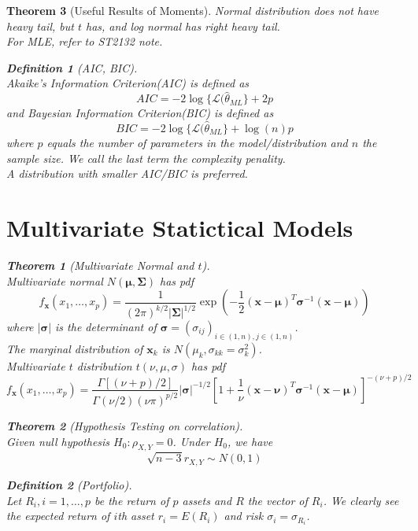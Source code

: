 \documentclass[12pt]{article}
\newtheorem{definition}{Definition}[section]
\newtheorem{theorem}{Theorem}[section]
\theoremstyle{definition}
\begin{document}
\begin{theorem}[Useful Results of Moments]
Normal distribution does not have heavy tail, but $t$ has, and log normal has right heavy tail.\\
For MLE, refer to ST2132 note.
\begin{definition}[AIC, BIC]
\hfill\\\normalfont 
Akaike's Information Criterion(AIC) is defined as
\[
AIC=-2\log\{\mathcal{L}(\hat{\theta}_{ML}\}+ 2p
\]
and Bayesian Information Criterion(BIC) is defined as
\[
BIC=-2\log\{\mathcal{L}(\hat{\theta}_{ML}\} + \log(n)p
\]
where $p$ equals the number of parameters in the model/distribution and $n$ the sample size. We call the last term the complexity penality.\\
A distribution with smaller AIC/BIC is preferred.
\end{definition}
\clearpage
\section{Multivariate Statictical Models}
\begin{theorem}[Multivariate Normal and {$t$}]
\hfill\\\normalfont Multivariate normal $N(\mathbf{\mu}, \mathbf{\Sigma})$ has pdf
\[
f_{\mathbf{x}}(x_1,\ldots, x_p)=\frac{1}{(2\pi)^{k/2}|\mathbf{\Sigma}|^{1/2}}\exp(-\frac{1}{2}(\mathbf{x}-\mathbf{\mu})^T\mathbf{\sigma}^{-1}(\mathbf{x}-\mathbf{\mu}))
\]
where $|\mathbf{\sigma}|$ is the determinant of $\mathbf{\sigma}=(\sigma_{ij})_{i\in (1, n), j\in (1, n)}$.\\
The marginal distribution of $\mathbf{x}_k$ is $N(\mu_k,\sigma_{kk}=\sigma_k^2)$.\\
Multivariate $t$ distribution $t(\nu, \mu, \sigma)$ has pdf
\[
f_{\mathbf{x}}(x_1,\ldots, x_p)=\frac{\Gamma[(\nu + p)/2]}{\Gamma(\nu/2)(\nu\pi)^{p/2}}|\mathbf{\sigma}|^{-1/2}[1+\frac{1}{\nu}(\mathbf{x}-\mathbf{\nu})^T\mathbf{\sigma}^{-1}(\mathbf{x}-\mathbf{\mu})]^{-(\nu+p)/2}
\]
\end{theorem}
\begin{theorem}[Hypothesis Testing on correlation]
\hfill\\\normalfont Given null hypothesis $H_0:\rho_{X,Y}=0$. Under $H_0$, we have
\[
\sqrt{n-3}r_{X,Y}\sim N(0,1)
\]
\end{theorem}
\begin{definition}[Portfolio]
\hfill\\\normalfont Let $R_i, i = 1,\ldots, p$ be the return of $p$ assets and $R$ the vector of $R_i$. We clearly see the expected return of $i$th asset $r_i = E(R_i)$ and risk $\sigma_i = \sigma_{R_i}$.

\end{definition}
\end{theorem}
\end{document}
